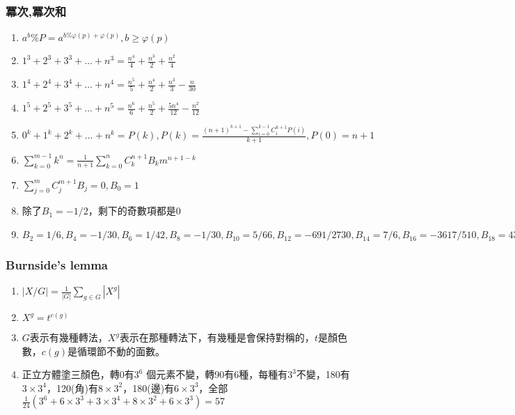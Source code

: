 \subsubsection{冪次,冪次和}
\begin{enumerate}\itemsep = -3pt
	\item $a^b\%P=a^{b\% \varphi (p)+\varphi (p)},b\geq \varphi (p)$
	\item $1^3+2^3+3^3+\ldots +n^3=\frac{n^4}{4}+\frac{n^3}{2}+\frac{n^2}{4}$
	\item $1^4+2^4+3^4+\ldots +n^4=\frac{n^5}{5}+\frac{n^4}{2}+\frac{n^3}{3}-\frac{n}{30}$
	\item $1^5+2^5+3^5+\ldots +n^5=\frac{n^6}{6}+\frac{n^5}{2}+\frac{5n^4}{12}-\frac{n^2}{12}$
	\item $0^k+1^k+2^k+\ldots +n^k = P(k),P(k)=\frac{(n+1)^{k+1}-\sum_{i=0}^{k-1}C_i^{k+1}P(i)}{k+1},P(0)=n+1$
	\item $\sum_{k=0}^{m-1}k^n=\frac{1}{n+1}\sum_{k=0}^{n}C_k^{n+1}B_km^{n+1-k}$
	\item $\sum_{j=0}^{m}C_j^{m+1}B_j=0,B_0=1$
	\item 除了$B_1=-1/2$，剩下的奇數項都是$0$
	\item $B_2=1/6,B_4=-1/30,B_6=1/42,B_8=-1/30,B_{10}=5/66,B_{12}=-691/2730,B_{14}=7/6,B_{16}=-3617/510,B_{18}=43867/798,B_{20}=-174611/330,$
\end{enumerate}

\subsubsection{Burnside's lemma}
\begin{enumerate}\itemsep = -3pt
	\item $|X/G| = \frac{1}{|G|}\sum_{g \in G}|X^g|$
	\item $X^g=t^{c(g)}$
	\item $G$表示有幾種轉法，$X^g$表示在那種轉法下，有幾種是會保持對稱的，$t$是顏色數，$c(g)$是循環節不動的面數。
	\item 正立方體塗三顏色，轉0有$3^6$ 個元素不變，轉90有6種，每種有$3^3$不變，180有$3\times 3^4$，120(角)有$8\times 3^2$，180(邊)有$6\times 3^3$，全部$\frac{1}{24}\left(3^6+6\times 3^3 + 3 \times 3^4 + 8 \times 3^2 + 6 \times 3^3 \right) = 57$
\end{enumerate}

